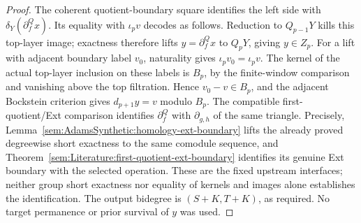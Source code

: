 \begin{proof}
The coherent quotient-boundary square identifies the left side with
$\delta_Y(\partial^Q_fx)$. Its equality with $\iota_pv$ decodes as
follows. Reduction to $Q_{p-1}Y$ kills this top-layer image; exactness
therefore lifts $y=\partial^Q_fx$ to $Q_pY$, giving $y\in Z_p$.
For a lift with adjacent boundary label $v_0$, naturality gives
$\iota_pv_0=\iota_pv$. The kernel of the actual top-layer inclusion
on these labels is $B_p$, by the finite-window comparison and vanishing
above the top filtration. Hence $v_0-v\in B_p$, and the adjacent
Bockstein criterion gives $d_{p+1}y=v$ modulo $B_p$.
The compatible first-quotient/Ext comparison identifies
$\partial^Q_f$ with $\partial_{g,h}$ of the same triangle.
Precisely, Lemma~\ref{sem:AdamsSynthetic:homology-ext-boundary}
lifts the already proved degreewise short exactness to the same comodule
sequence, and Theorem~\ref{sem:Literature:first-quotient-ext-boundary}
identifies its genuine Ext boundary with the selected operation.
These are the fixed upstream interfaces; neither group short exactness
nor equality of kernels and images alone establishes the identification.
The output bidegree is $(S+K,T+K)$, as required.
No target permanence or prior survival of $y$ was used.
\end{proof}

